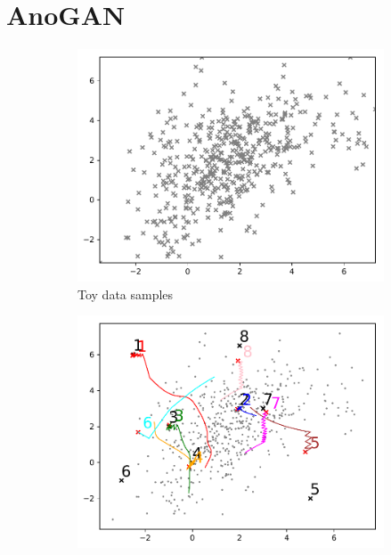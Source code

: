 \documentclass{article} %
\begin{document}
\begin{figure}[h]
	\label{fig:1d_gan}
\end{figure}

\section{AnoGAN}
\begin{figure}[h]
	\centering
	\captionsetup{labelformat=empty}
	\begin{subfigure}[b]{0.45\textwidth}
		\includegraphics[width=\textwidth]{toy2_ano_gan_ls9_2000.pdf}
		\caption{Toy data samples}
		\label{fig:toy}
	\end{subfigure}
	\begin{subfigure}[b]{0.45\textwidth}
		\includegraphics[width=\textwidth]{toy2_ano_gan_ls9_2000_test_ano_50.pdf}

\end{subfigure}
\end{figure}
\end{document}

